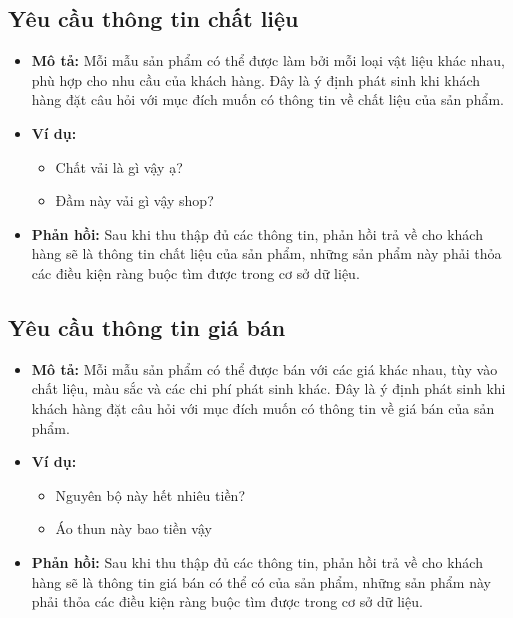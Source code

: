 \subsection{Yêu cầu thông tin chất liệu}
\begin{itemize}
    \item \textbf{Mô tả:} Mỗi mẫu sản phẩm có thể được làm bởi mỗi loại vật liệu khác nhau, phù hợp cho nhu cầu của khách hàng. Đây là ý định phát sinh khi khách hàng đặt câu hỏi với mục đích muốn có thông tin về chất liệu của sản phẩm.
    \item \textbf{Ví dụ:}
    \begin{itemize}
        \item Chất vải là gì vậy ạ?
        \item Đầm này vải gì vậy shop?
    \end{itemize}
    \item \textbf{Phản hồi:} Sau khi thu thập đủ các thông tin, phản hồi trả về cho khách hàng sẽ là thông tin chất liệu của sản phẩm, những sản phẩm này phải thỏa các điều kiện ràng buộc tìm được trong cơ sở dữ liệu.
\end{itemize}

\subsection{Yêu cầu thông tin giá bán}
\begin{itemize}
    \item \textbf{Mô tả:} Mỗi mẫu sản phẩm có thể được bán với các giá khác nhau, tùy vào chất liệu, màu sắc và các chi phí phát sinh khác. Đây là ý định phát sinh khi khách hàng đặt câu hỏi với mục đích muốn có thông tin về giá bán của sản phẩm.
    \item \textbf{Ví dụ:}
    \begin{itemize}
        \item Nguyên bộ này hết nhiêu tiền?
        \item Áo thun này bao tiền vậy
    \end{itemize}
    \item \textbf{Phản hồi:} Sau khi thu thập đủ các thông tin, phản hồi trả về cho khách hàng sẽ là thông tin giá bán có thể có của sản phẩm, những sản phẩm này phải thỏa các điều kiện ràng buộc tìm được trong cơ sở dữ liệu.
\end{itemize}

